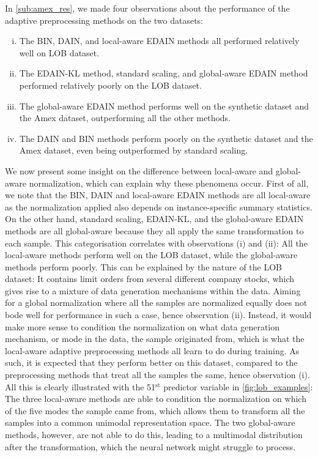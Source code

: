 \documentclass{statsmsc}
\begin{document}
{In \cref{sub:amex_res}, we made four observations about the performance of the adaptive
preprocessing methods on the two datasets:
\begin{enumerate}[(i)]
    \item The \ac{BIN}, \ac{DAIN}, and local-aware \ac{EDAIN} methods
        all performed relatively well on \ac{LOB} dataset.
    \item The EDAIN-KL method, standard scaling, and global-aware EDAIN method performed
        relatively poorly on the \ac{LOB} dataset.
    \item The global-aware \ac{EDAIN} method performs well on the synthetic dataset
        and the Amex dataset, outperforming all the other methods.
    \item The \ac{DAIN} and \ac{BIN} methods perform poorly on the synthetic dataset
        and the Amex dataset, even being outperformed by standard scaling.
\end{enumerate}
We now present some insight on the difference between local-aware and global-aware
normalization, which can explain why these phenomena occur.
%
First of all, we note that the \ac{BIN}, \ac{DAIN} and local-aware \ac{EDAIN} methods are
all local-aware as the normalization applied also depends on instance-specific summary statistics.
On the other hand, standard scaling, \ac{EDAIN-KL}, and the global-aware \ac{EDAIN} methods are
all global-aware because they all apply the same transformation to each sample. This categorisation
correlates with observations (i) and (ii): All the local-aware methods perform well on the
\ac{LOB} dataset, while the global-aware methods perform poorly.
This can be explained by the nature of the \ac{LOB} dataset: It contains limit orders from several
different company stocks, which gives rise to a mixture of data generation mechanisms within the
data. Aiming for a global normalization where all the samples are normalized equally does not bode
well for performance in such a case, hence observation (ii). Instead, it would make more sense to
condition the normalization on what data generation mechanism, or mode in the data, the sample
originated from, which is what the local-aware adaptive preprocessing methods
all learn to do during training. As such, it is expected that they perform better on this dataset,
compared to the preprocessing methods that treat all the samples the same, hence observation (i).
All this is clearly illustrated with the 51$^{\textrm{st}}$ predictor variable
in \cref{fig:lob_examples}:
The three local-aware methods are able to condition the normalization on which
of the five modes the sample came from, which allows them to transform all the samples into a common
unimodal representation space. The two global-aware methods, however, are not able to do this,
leading to a multimodal distribution after the transformation, which the neural network might
struggle to process.

}
\end{document}
